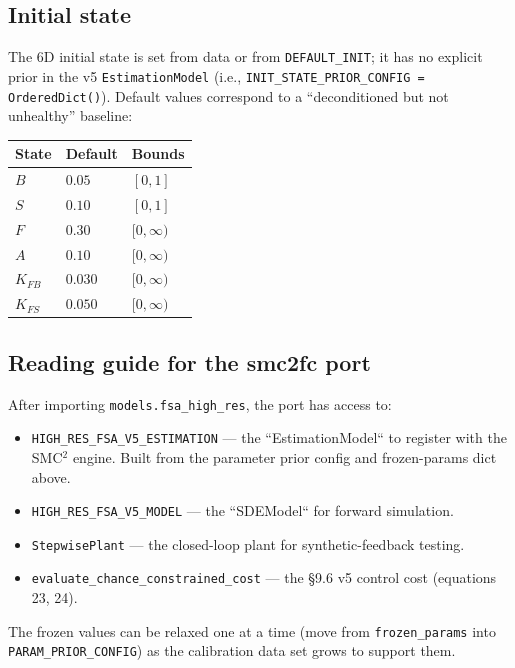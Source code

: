 \subsection*{Initial state}

The 6D initial state is set from data or from \texttt{DEFAULT\_INIT}; it
has no explicit prior in the v5 \texttt{EstimationModel} (i.e.,
\texttt{INIT\_STATE\_PRIOR\_CONFIG = OrderedDict()}). Default values
correspond to a ``deconditioned but not unhealthy'' baseline:

\begin{center}\small
\begin{tabular}{lll}
\toprule
State & Default & Bounds \\
\midrule
$B$    & $0.05$  & $[0, 1]$ \\
$S$    & $0.10$  & $[0, 1]$ \\
$F$    & $0.30$  & $[0, \infty)$ \\
$A$    & $0.10$  & $[0, \infty)$ \\
$K_{FB}$ & $0.030$ & $[0, \infty)$ \\
$K_{FS}$ & $0.050$ & $[0, \infty)$ \\
\bottomrule
\end{tabular}
\end{center}

\subsection*{Reading guide for the smc2fc port}

After importing \texttt{models.fsa\_high\_res}, the port has access to:

\begin{itemize}
  \item \texttt{HIGH\_RES\_FSA\_V5\_ESTIMATION} — the ``EstimationModel`` to register with the SMC$^2$ engine. Built from the parameter prior config and frozen-params dict above.
  \item \texttt{HIGH\_RES\_FSA\_V5\_MODEL} — the ``SDEModel`` for forward simulation.
  \item \texttt{StepwisePlant} — the closed-loop plant for synthetic-feedback testing.
  \item \texttt{evaluate\_chance\_constrained\_cost} — the §9.6 v5 control cost (equations 23, 24).
\end{itemize}

The frozen values can be relaxed one at a time (move from
\texttt{frozen\_params} into \texttt{PARAM\_PRIOR\_CONFIG}) as the
calibration data set grows to support them.
